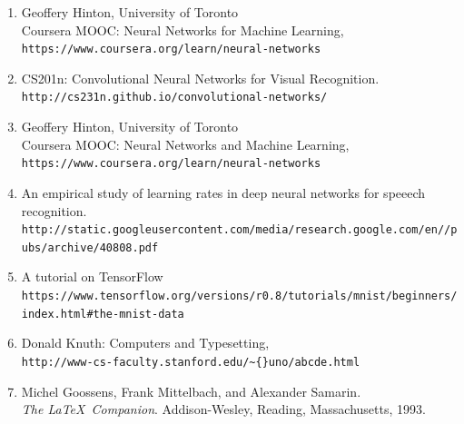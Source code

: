 \documentclass[a4paper,12pt]{report}%
\begin{document}
\begin{enumerate}%


\item[Hinton]
    Geoffery Hinton, University of Toronto \\
    Coursera MOOC: Neural Networks for Machine Learning, \\
    {\verb"https://www.coursera.org/learn/neural-networks"}

\item[CS201n]
    CS201n: Convolutional Neural Networks for Visual Recognition. \\
    {\verb"http://cs231n.github.io/convolutional-networks/"}


\item[Hinton]
    Geoffery Hinton, University of Toronto \\
    Coursera MOOC: Neural Networks and Machine Learning,\\
    {\verb"https://www.coursera.org/learn/neural-networks"}


\item[Google]
    An empirical study of learning rates in deep neural networks for speeech recognition.\\
    {\verb"http://static.googleusercontent.com/media/research.google.com/en//pubs/archive/40808.pdf"}


\item[TensorFlow]
    A tutorial on TensorFlow \\
    {\verb"https://www.tensorflow.org/versions/r0.8/tutorials/mnist/beginners/index.html#the-mnist-data"}

\item[Knuth]
    Donald Knuth: Computers and Typesetting,\\
    {\verb"http://www-cs-faculty.stanford.edu/~{}uno/abcde.html"}

\item[\TeX]
    Michel Goossens, Frank Mittelbach, and Alexander Samarin. \\
    \textit{The \LaTeX\ Companion}.
    Addison-Wesley, Reading, Massachusetts, 1993.
\end{enumerate}





\printindex

\end{document}
